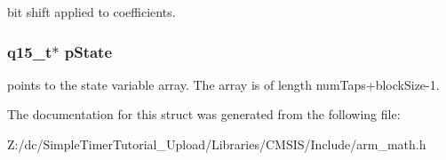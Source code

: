 bit shift applied to coefficients. \hypertarget{structarm__lms__instance__q15_ae29dfdb736374fcddaeaec4b7770170c}{
\subsubsection[{p\-State}]{\setlength{\rightskip}{0pt plus 5cm}q15\-\_\-t$\ast$ p\-State}}\label{structarm__lms__instance__q15_ae29dfdb736374fcddaeaec4b7770170c}
points to the state variable array. The array is of length num\-Taps+block\-Size-\/1. 

The documentation for this struct was generated from the following file\-:\begin{DoxyCompactItemize}
\item 
Z\-:/dc/\-Simple\-Timer\-Tutorial\-\_\-\-Upload/\-Libraries/\-C\-M\-S\-I\-S/\-Include/arm\-\_\-math.\-h\end{DoxyCompactItemize}
